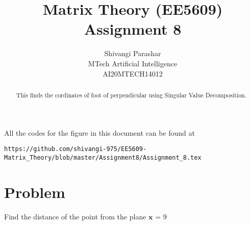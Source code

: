 \documentclass[journal,12pt,twocolumn]{IEEEtran}
\begin{document}
\makeatletter
{}
\makeatother
\let\StandardTheFigure\thefigure
\let\vec\mathbf
\renewcommand{\thefigure}{\theproblem}
\def\putbox#1#2#3{\makebox[0in][l]{\makebox[#1][l]{}\raisebox{\baselineskip}[0in][0in]{\raisebox{#2}[0in][0in]{#3}}}}
     \def\rightbox#1{\makebox[0in][r]{#1}}
     \def\centbox#1{\makebox[0in]{#1}}
     \def\topbox#1{\raisebox{-\baselineskip}[0in][0in]{#1}}
     \def\midbox#1{\raisebox{-0.5\baselineskip}[0in][0in]{#1}}
\vspace{3cm}
\title{Matrix Theory (EE5609) Assignment 8}
\author{Shivangi Parashar\\MTech Artificial Intelligence\\AI20MTECH14012}
\maketitle
\newpage
\bigskip
\renewcommand{\thefigure}{\theenumi}
\renewcommand{\thetable}{\theenumi}
\begin{abstract}
This finds the cordinates of foot of perpendicular using Singular Value Decomposition.
\end{abstract}
All the codes for the figure in this document can be found at
\begin{lstlisting}
https://github.com/shivangi-975/EE5609-Matrix_Theory/blob/master/Assignment8/Assignment_8.tex
\end{lstlisting}
\section{\textbf{Problem}}
Find the distance of the point  from the plane $\vec{x}$ = 9
\end{document}
